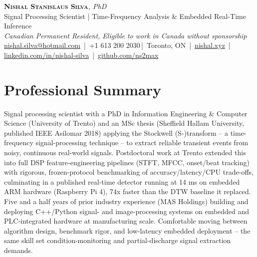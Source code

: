 \documentclass[11pt]{article}
\makeatletter
\newcommand{\cvName}{Nishal Stanislaus Silva}
\newcommand{\cvEmail}{nishal.silva@hotmail.com}
\newcommand{\cvPhone}{+1 613 200 2030}
\newcommand{\cvCity}{Toronto, ON}
\newcommand{\cvSite}{https://nishal.xyz}
\newcommand{\cvLinkedIn}{https://www.linkedin.com/in/nishal-silva}
\newcommand{\cvGitHub}{https://github.com/ns2max}
\newcommand{\cvStatus}{Canadian Permanent Resident, Eligible to work in Canada without sponsorship}
\newcommand{\cvTagline}{Signal Processing Scientist | Time-Frequency Analysis \& Embedded Real-Time Inference}
\makeatother
\begin{document}
\pagestyle{empty}
\begin{center}
    {\LARGE \scshape \textbf{\cvName}}{\large \textit{, PhD}}\\[1pt]
    {\small \cvTagline}\\[1pt]
    {\footnotesize\textit{\cvStatus}}\\[1pt]
    {\small
    \href{mailto:\cvEmail}{\cvEmail} \,|\, \cvPhone \,|\, \cvCity
    \,|\, \href{\cvSite}{nishal.xyz} \,|\, \href{\cvLinkedIn}{linkedin.com/in/nishal-silva}
    \,|\, \href{\cvGitHub}{github.com/ns2max}}
\end{center}

\section*{Professional Summary}
Signal processing scientist with a PhD in Information Engineering \& Computer Science (University of Trento) and an MSc thesis (Sheffield Hallam University, published IEEE Asilomar 2018) applying the Stockwell (S-)transform -- a time-frequency signal-processing technique -- to extract reliable transient events from noisy, continuous real-world signals. Postdoctoral work at Trento extended this into full DSP feature-engineering pipelines (STFT, MFCC, onset/beat tracking) with rigorous, frozen-protocol benchmarking of accuracy/latency/CPU trade-offs, culminating in a published real-time detector running at 14 ms on embedded ARM hardware (Raspberry Pi 4), 74x faster than the DTW baseline it replaced. Five and a half years of prior industry experience (MAS Holdings) building and deploying C++/Python signal- and image-processing systems on embedded and PLC-integrated hardware at manufacturing scale. Comfortable moving between algorithm design, benchmark rigor, and low-latency embedded deployment -- the same skill set condition-monitoring and partial-discharge signal extraction demands.
\end{document}
